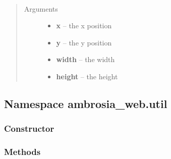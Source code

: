 \documentclass[letterpaper,10pt,english]{sphinxmanual}
\begin{document}
\begin{fulllineitems}
\label{ambrosia_web.layout.Dimensions:ambrosia_web.layout.Dimensions}~\begin{quote}\begin{description}
\item[{Arguments}] \leavevmode\begin{itemize}
\item {} 
\textbf{x} -- the x position

\item {} 
\textbf{y} -- the y position

\item {} 
\textbf{width} -- the width

\item {} 
\textbf{height} -- the height

\end{itemize}

\end{description}\end{quote}

\end{fulllineitems}



\subsection{Namespace ambrosia\_web.util}
\label{ambrosia_web.util:namespace-ambrosia-web-util}\label{ambrosia_web.util::doc}

\subsubsection{Constructor}
\label{ambrosia_web.util:constructor}

\begin{fulllineitems}
\label{ambrosia_web.util:ambrosia_web.util}
\end{fulllineitems}



\subsubsection{Methods}
\label{ambrosia_web.util:methods}
\end{document}
